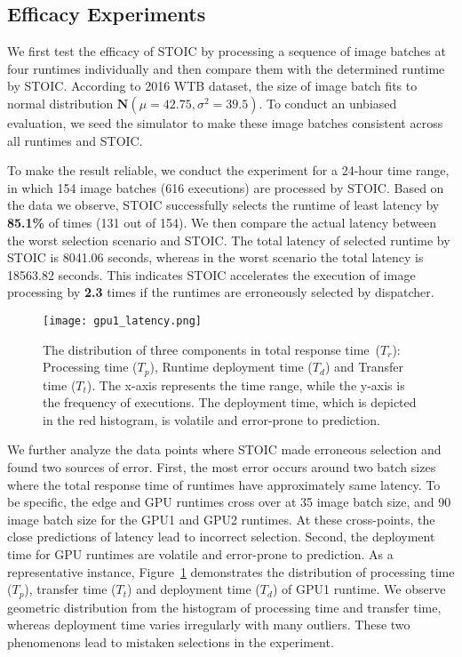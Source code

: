 \subsection{Efficacy Experiments}

We first test the efficacy of STOIC by processing a sequence of image batches at four runtimes individually and then compare them with the determined runtime by STOIC. According to 2016 WTB dataset, the size of image batch fits to normal distribution $\mathbf{N}(\mu = 42.75, \sigma^2 = 39.5)$. To conduct an unbiased evaluation, we seed the simulator to make these image batches consistent across all runtimes and STOIC.


To make the result reliable, we conduct the experiment for a 24-hour time range, in which  154 image batches (616 executions) are processed by STOIC. Based on the data we observe, STOIC successfully selects the runtime of least latency by \textbf{85.1\%} of times (131 out of 154). We then compare the actual latency between the worst selection scenario and STOIC. The total latency of selected runtime by STOIC is 8041.06 seconds, whereas in the worst scenario the total latency is 18563.82 seconds. This indicates STOIC accelerates the execution of image processing by \textbf{2.3} times if the runtimes are erroneously selected by dispatcher.

\begin{figure}[t] \centering 
\texttt{[image: gpu1\_latency.png]}
\caption{The distribution of three components in total response time~($T_r$): Processing time ($T_p$), Runtime deployment time ($T_d$) and Transfer time ($T_t$). The x-axis represents the time range, while the y-axis is the frequency of executions. The deployment time, which is depicted in the red histogram, is volatile and error-prone to prediction.
\label{fig:breakdown}}
\end{figure}

We further analyze the data points where STOIC made erroneous selection and found two sources of error. First, the most error occurs around two batch sizes where the total response time of runtimes have approximately same latency. To be specific, the edge and GPU runtimes cross over at 35 image batch size, and 90 image batch size for the GPU1 and GPU2 runtimes. At these cross-points, the close predictions of latency lead to incorrect selection. Second, the deployment time for GPU runtimes are volatile and error-prone to prediction. As a representative instance, Figure~\ref{fig:breakdown} demonstrates the distribution of processing time ($T_p$), transfer time ($T_t$) and deployment time ($T_d$) of GPU1 runtime. We observe geometric distribution from the histogram of processing time and transfer time, whereas deployment time varies irregularly with many outliers. These two phenomenons lead to mistaken selections in the experiment.

